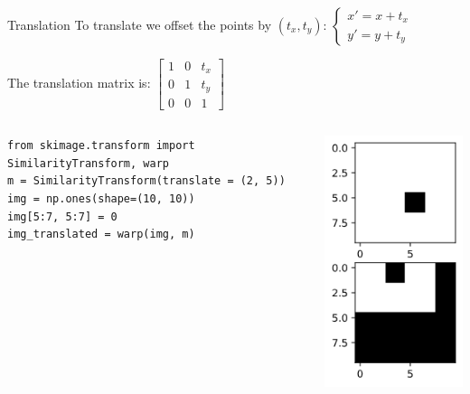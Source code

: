 \documentclass[9pt, aspectratio=169]{beamer}
\begin{document}
\begin{frame}
    {Translation}
    To translate we offset the points by $(t_x, t_y)$: $\begin{cases}x' = x + t_x\\y' = y + t_y\end{cases}$

    The translation matrix is: $\begin{bmatrix}1&0&t_x\\0&1&t_y\\0&0&1\end{bmatrix}$

    \pause
    \begin{columns}
        \begin{column}{0.7\textwidth}
            \begin{codebox}
                \texttt{from skimage.transform import SimilarityTransform, warp\\
                    m = SimilarityTransform(translate = (2, 5))\\
                    img = np.ones(shape=(10, 10))\\
                    img[5:7, 5:7] = 0\\
                    img\_translated = warp(img, m)
                }
            \end{codebox}
        \end{column}
        \pause
        \begin{column}{0.3\textwidth}
            \includegraphics[width=.7\textwidth]{translation.png}
        \end{column}
    \end{columns}

\end{frame}
\end{document}

